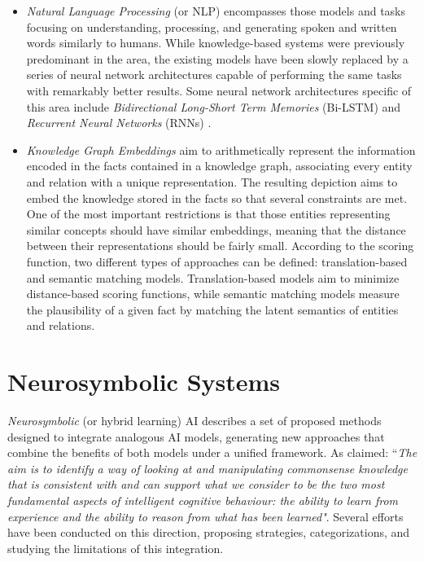\begin{itemize}
\begin{itemize}
        \item \textit{Natural Language Processing} (or NLP) \citep{chowdhury_2003_nlp} encompasses those models and tasks focusing on understanding, processing, and generating spoken and written words similarly to humans. While knowledge-based systems were previously predominant in the area, the existing models have been slowly replaced by a series of neural network architectures capable of performing the same tasks with remarkably better results. Some neural network architectures specific of this area include \textit{Bidirectional Long-Short Term Memories} (Bi-LSTM) \citep{devlin-etal-2019-bert,peters-etal-2018-deep} and \textit{Recurrent Neural Networks} (RNNs) \citep{wang-etal-2016-combination}. 
        
        \item \textit{Knowledge Graph Embeddings} \citep{dai_survey_2020} aim to arithmetically represent the information encoded in the facts contained in a knowledge graph, associating every entity and relation with a unique representation. The resulting depiction aims to embed the knowledge stored in the facts so that several constraints are met. One of the most important restrictions is that those entities representing similar concepts should have similar embeddings, meaning that the distance between their representations should be fairly small. According to the scoring function, two different types of approaches can be defined: translation-based and semantic matching models. Translation-based models aim to minimize distance-based scoring functions, while semantic matching models measure the plausibility of a given fact by matching the latent semantics of entities and relations.
    \end{itemize}

\end{itemize}


\section{Neurosymbolic Systems} \label{sec:sota_neurosymbolic_systems}
\textit{Neurosymbolic} (or hybrid learning) AI describes a set of proposed methods designed to integrate analogous AI models, generating new approaches that combine the benefits of both models under a unified framework. As \cite{valiant_three_2003} claimed: ``\textit{The aim is to identify a way of looking at and manipulating commonsense knowledge that is consistent with and can support what we consider to be the two most fundamental aspects of intelligent cognitive behaviour: the ability to learn from experience and the ability to reason from what has been learned"}. Several efforts have been conducted on this direction, proposing strategies, categorizations, and studying the limitations of this integration. 

